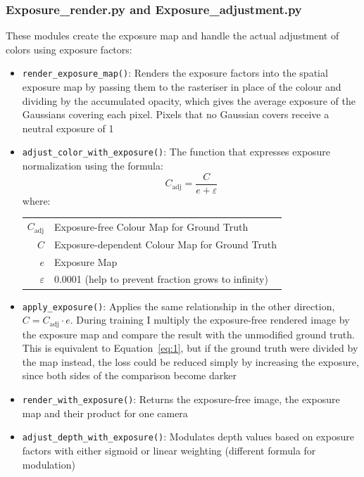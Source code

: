 \documentclass[11pt,a4paper]{article}
\begin{document}
\subsubsection{Exposure\_render.py and Exposure\_adjustment.py}
\label{sec:render}

These modules create the exposure map and handle the actual adjustment of colors using exposure factors:

\begin{itemize}
\item \texttt{render\_exposure\_map()}: Renders the exposure factors into the spatial exposure map by passing them to the rasteriser in place of the colour and dividing by the accumulated opacity, which gives the average exposure of the Gaussians covering each pixel. Pixels that no Gaussian covers receive a neutral exposure of 1
\item \texttt{adjust\_color\_with\_exposure()}: The function that expresses exposure normalization using the formula:
\begin{equation}
\label{eq:1}
C_{\mathrm{adj}} = \frac{C}{e + \varepsilon}
\end{equation}
where:

\begin{tabular}{@{}r@{${}={}$}l@{}}
$C_{\mathrm{adj}}$ & Exposure-free Colour Map for Ground Truth \\
$C$ & Exposure-dependent Colour Map for Ground Truth \\
$e$ & Exposure Map \\
$\varepsilon$ & 0.0001 (help to prevent fraction grows to infinity)
\end{tabular}

\item \texttt{apply\_exposure()}: Applies the same relationship in the other direction, $C = C_{\mathrm{adj}} \cdot e$. During training I multiply the exposure-free rendered image by the exposure map and compare the result with the unmodified ground truth. This is equivalent to Equation~\ref{eq:1}, but if the ground truth were divided by the map instead, the loss could be reduced simply by increasing the exposure, since both sides of the comparison become darker
\item \texttt{render\_with\_exposure()}: Returns the exposure-free image, the exposure map and their product for one camera
\item \texttt{adjust\_depth\_with\_exposure()}: Modulates depth values based on exposure factors with either sigmoid or linear weighting (different formula for modulation)
\end{itemize}
\end{document}
